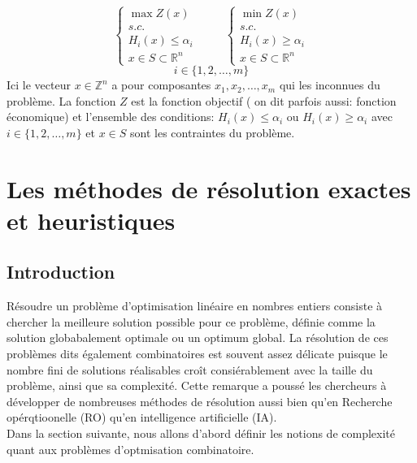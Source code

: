 \documentclass[a4paper,11pt,oneside]{report}
\theoremstyle{plain}
\newcommand{\0}{/ \! \! \! 0}
\theoremstyle{plain}
\begin{document}
 $$
    \left\{ 
        \begin{array}{c}
         \max  Z(x) \\
         s.c.\\
         H_i(x) \leq \alpha_i   \\
         x \in S \subset \mathbb{R}^n
        \end{array}
     \right.
     \hspace{1cm}
    \left\{ 
        \begin{array}{c}
         \min  Z(x) \\
         s.c.\\
         H_i(x) \geq \alpha_i  \\
         x \in S \subset \mathbb{R}^n
        \end{array}
     \right.  
 $$
 $$ i \in \{ 1, 2 , \hdots, m\}$$
Ici le vecteur $x\in \mathbb{Z}^n $ a pour composantes $x_1, x_2, \hdots, x_m$ qui les inconnues du probl\`eme.
La fonction $Z$ est la fonction objectif ( on dit parfois aussi: fonction \'economique) et l'ensemble des conditions: $H_i(x) \leq \alpha_i $ ou 
$H_i(x) \geq \alpha_i $ avec $i\in \{1,2,\hdots,m\}$ et $x \in S$ sont les contraintes du probl\`eme. 
\chapter{Les m\'ethodes de r\'esolution exactes et heuristiques}
\section{Introduction}
R\'esoudre un probl\`eme d'optimisation lin\'eaire en nombres entiers consiste \`a chercher la meilleure solution possible pour ce probl\`eme, 
d\'efinie comme la solution globabalement optimale ou un optimum global. La r\'esolution de ces probl\`emes dits \'egalement combinatoires est
souvent assez d\'elicate puisque le nombre fini de solutions r\'ealisables cro\^it consi\'erablement avec la taille du probl\`eme, ainsi que sa 
complexit\'e. Cette remarque a pouss\'e les chercheurs \`a d\'evelopper de nombreuses m\'ethodes de r\'esolution aussi bien qu'en Recherche op\'erqtioonelle
(RO) qu'en intelligence artificielle (IA).\\
Dans la section suivante, nous allons d'abord d\'efinir les notions de complexit\'e quant aux probl\`emes d'optmisation combinatoire.
\end{document}
